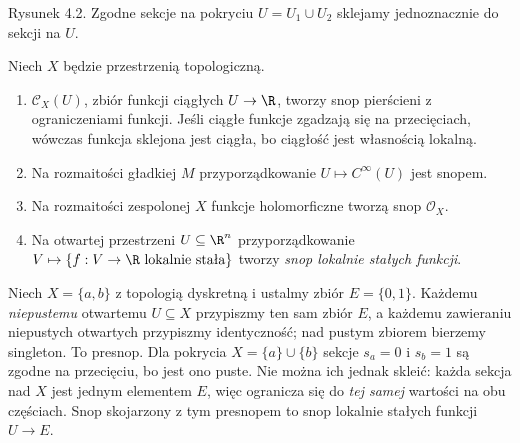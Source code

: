 \begin{center}

{\small Rysunek 4.2. Zgodne sekcje na pokryciu $U=U_1\cup U_2$ sklejamy jednoznacznie do sekcji na $U$.}\par
\end{center}

\begin{przyklad}
Niech $X$ będzie przestrzenią topologiczną.
\begin{enumerate}[label=\alph*)]
\item $\mathcal C_X(U)$, zbiór funkcji ciągłych $U\to\R$,
tworzy snop pierścieni z ograniczeniami funkcji.
Jeśli ciągłe funkcje zgadzają się na przecięciach,
wówczas funkcja sklejona jest ciągła, bo ciągłość
jest własnością lokalną.
\item Na rozmaitości gładkiej $M$ przyporządkowanie
$U\mapsto C^\infty(U)$ jest snopem.
\item Na rozmaitości zespolonej $X$ funkcje holomorficzne
tworzą snop $\mathcal O_X$.
\item Na otwartej przestrzeni $U\subseteq\R^n$ przyporządkowanie
$V\mapsto\{f:V\to\R\ \text{lokalnie stała}\}$
tworzy \emph{snop lokalnie stałych funkcji}.
\end{enumerate}
\end{przyklad}

\begin{przyklad}
\label{prz:presheaf-not-sheaf}
Niech $X=\{a,b\}$ z topologią dyskretną i ustalmy
zbiór $E=\{0,1\}$. Każdemu \emph{niepustemu}
otwartemu $U\subseteq X$ przypiszmy ten sam zbiór $E$,
a każdemu zawieraniu niepustych otwartych przypiszmy
identyczność; nad pustym zbiorem bierzemy singleton.
To presnop. Dla pokrycia $X=\{a\}\cup\{b\}$
sekcje $s_a=0$ i $s_b=1$ są zgodne na przecięciu,
bo jest ono puste. Nie można ich jednak skleić:
każda sekcja nad $X$ jest jednym elementem $E$,
więc ogranicza się do \emph{tej samej} wartości
na obu częściach. Snop skojarzony z tym presnopem
to snop lokalnie stałych funkcji $U\to E$.
\end{przyklad}

